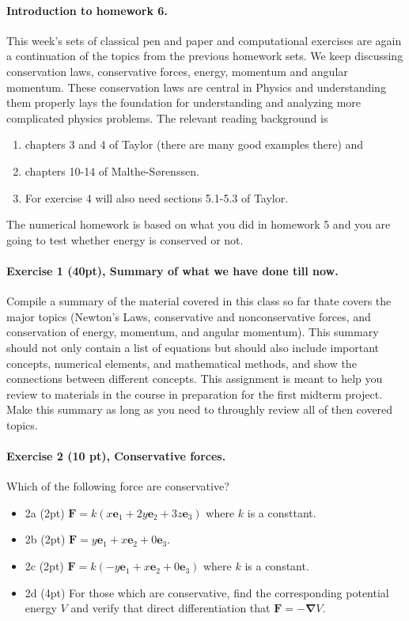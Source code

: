 \documentclass[%
oneside,                 %
final,                   %
10pt]{article}
\begin{document}
\noindent
\paragraph{Introduction to homework 6.}
This week's sets of classical pen and paper and computational
exercises are again a continuation of the topics from the previous homework sets. We keep
discussing conservation laws, conservative forces, energy, momentum and angular momentum. These conservation laws are central in Physics and understanding them properly lays the foundation for understanding and analyzing more complicated physics problems.
The relevant reading background is
\begin{enumerate}
\item chapters 3 and 4 of Taylor (there are many good examples there) and

\item chapters 10-14 of Malthe-Sørenssen.

\item For exercise 4 will also need sections 5.1-5.3 of Taylor.
\end{enumerate}

\noindent
The numerical homework is based on what you did in homework 5 and you are going to test whether energy is conserved or not.


\paragraph{Exercise 1 (40pt), Summary of what we have done till now.}
Compile a summary of the material covered in this class so far thate
covers the major topics (Newton’s Laws, conservative and
nonconservative forces, and conservation of energy, momentum, and
angular momentum).  This summary should not only contain a list of
equations but should also include important concepts, numerical
elements, and mathematical methods, and show the connections between
different concepts.  This assignment is meant to help you review to
materials in the course in preparation for the first midterm project.
Make this summary as long as you need to throughly review all of then
covered topics.




\paragraph{Exercise 2 (10 pt), Conservative forces.}
Which of the following force are conservative?
\begin{itemize}
\item 2a (2pt) $\bm{F}=k(x\bm{e}_1+2y\bm{e}_2+3z\bm{e}_3)$ where $k$ is a consttant.

\item 2b (2pt) $\bm{F}=y\bm{e}_1+x\bm{e}_2+0\bm{e}_3$.

\item 2c (2pt) $\bm{F}=k(-y\bm{e}_1+x\bm{e}_2+0\bm{e}_3)$ where $k$ is a constant.

\item 2d (4pt) For those which are conservative, find the corresponding potential energy $V$ and verify that direct differentiation that $\bm{F}=-\bm{\nabla} V$.
\end{itemize}
\end{document}
